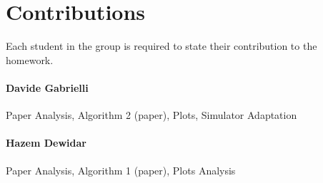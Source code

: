 \section*{Contributions}
Each student in the group is required to state their contribution to the homework.

\paragraph{Davide Gabrielli} Paper Analysis, Algorithm 2 (paper), Plots, Simulator Adaptation

\paragraph{Hazem Dewidar} Paper Analysis, Algorithm 1 (paper), Plots Analysis


